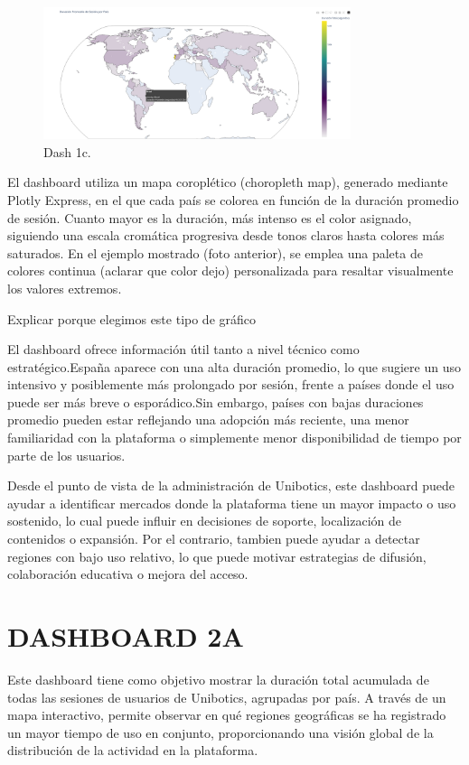 \documentclass[a4paper, 12pt]{book}
\begin{document}
\begin{figure}
  \centering
  \includegraphics[width=9cm, keepaspectratio]{img/1c.png}
  \caption{Dash 1c.}\label{fig:1c}
\end{figure}

El dashboard utiliza un mapa coroplético (choropleth map), generado mediante Plotly Express, en el que cada país se colorea en función de la duración promedio de sesión. Cuanto mayor es la duración, más intenso es el color asignado, siguiendo una escala cromática progresiva desde tonos claros hasta colores más saturados. En el ejemplo mostrado (foto anterior), se emplea una paleta de colores continua (aclarar que color dejo) personalizada para resaltar visualmente los valores extremos.

Explicar porque elegimos este tipo de gráfico

El dashboard ofrece información útil tanto a nivel técnico como estratégico.España aparece con una alta duración promedio, lo que sugiere un uso intensivo y posiblemente más prolongado por sesión, frente a países donde el uso puede ser más breve o esporádico.Sin embargo, países con bajas duraciones promedio pueden estar reflejando una adopción más reciente, una menor familiaridad con la plataforma o simplemente menor disponibilidad de tiempo por parte de los usuarios.

Desde el punto de vista de la administración de Unibotics, este dashboard puede ayudar a identificar mercados donde la plataforma tiene un mayor impacto o uso sostenido, lo cual puede influir en decisiones de soporte, localización de contenidos o expansión. Por el contrario, tambien puede ayudar a detectar regiones con bajo uso relativo, lo que puede motivar estrategias de difusión, colaboración educativa o mejora del acceso.

\section{DASHBOARD 2A}

Este dashboard tiene como objetivo mostrar la duración total acumulada de todas las sesiones de usuarios de Unibotics, agrupadas por país. A través de un mapa interactivo, permite observar en qué regiones geográficas se ha registrado un mayor tiempo de uso en conjunto, proporcionando una visión global de la distribución de la actividad en la plataforma.
\end{document}
